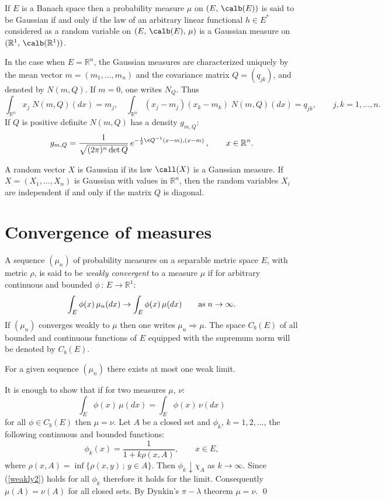 \documentclass[preprint]{imsart}
\def\R{\mathbb R}
\begin{document}
{If $E$ is a Banach space then a probability measure $\mu$ on
$(E,\, \calb(E))$ is said to be Gaussian if and only if the law of an
arbitrary linear functional $h\in E^*$ considered as a random
variable on $(E,\, \calb(E),\, \mu)$ is a Gaussian measure on
$(\R^1,\, \calb(\R^1))$.

In the case when $E=\R^n$, the Gaussian measures are characterized
uniquely by the mean vector $m=(m_1,\ldots ,m_n)$ and the
covariance matrix $Q=(q_{jk})$, and denoted by $N(m,Q)$.
If $m=0$, one writes $N_Q$. Thus
$$
\int_{\R^n} x_j\; N(m,Q)(dx)=m_j, \quad
\int_{\R^n} (x_j-m_j)(x_k-m_k)\; N(m,Q)(dx)=q_{jk},
\qquad j,k=1,\ldots ,n.
$$
If $Q$ is positive definite   $N(m,Q)$ has a density $g_{m,Q}$:
$$
g_{m,Q}= \frac{1}{\sqrt{
(2\pi)^n\det Q }}
\,
e^{-\frac{1}{2} \<Q^{-1}(x-m),(x-m)\>},\qquad x\in\R^n.
$$

A random vector $X$ is Gaussian if its law $\call(X)$ is a
Gaussian measure. If $X=(X_1,\ldots, X_n)$ is Gaussian with values
in $\R^n$, then the random variables $X_i$ are independent if and
only if the matrix $Q$ is diagonal.




\section{Convergence of measures}


A sequence $(\mu_n)$ of probability measures on a
  separable metric space $E$, with metric $\rho$,
   is said to be
{\em weakly convergent} to a measure $\mu$ if for
arbitrary  continuous and bounded $\phi \,
:\, E\to\R^1$:
\begin{equation}\label{weakly1}
\int_E \phi (x)\, \mu_n(dx)\to \int_E \phi (x)\, \mu(dx)
\qquad {\rm as}\; n\to\infty.
\end{equation}
If $(\mu_n)$    converges weakly to  $\mu$    then one
writes $\mu_n\Rightarrow\mu$.
The space $C_b(E)$ of
all bounded and continuous functions of $E$ equipped
with the supremum norm will be denoted by $C_b(E)$.

\begin{Proposition}For a given sequence $(\mu_n)$ there exists
at most one weak limit.
\end{Proposition}
It is enough to show that if for two measures $\mu$,
$\nu$:
\begin{equation}\label{weakly2}
 \int_E \phi (x)\, \mu(dx)= \int_E \phi (x)\, \nu(dx)
\end{equation}
for all $\phi\in C_b(E)$ then $\mu=\nu$. Let $A$ be a
closed set and $\phi_k$, $k=1,2,\ldots$, the following
continuous and bounded functions:
$$
\phi_k(x)=\frac{1}{1+k\rho(x,A)},\qquad x\in E,
$$
where $\rho(x,A)=\inf \{\rho(x,y)\, ; \, y\in A\}$.
Then $\phi_k\downarrow\chi_A$ as $k\to\infty$. Since
(\ref{weakly2}) holds for all $\phi_k$ therefore it
holds for the limit. Consequently $\mu(A)=\nu(A)$ for
all closed sets. By Dynkin's $\pi-\lambda$ theorem
$\mu=\nu$. \qed


}
\end{document}
